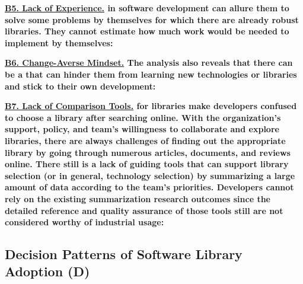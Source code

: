 \nd\bf{\ul{B5. Lack of Experience.}}  in software development can allure them to solve some problems by themselves for which there are already robust libraries. They cannot estimate how much work would be needed to implement by themselves: 


\nd\bf{\ul{B6. Change-Averse Mindset.}} The analysis also reveals that there can be a  that can hinder them from learning new technologies or libraries and stick to their own development: 

\nd\bf{\ul{B7. Lack of Comparison Tools.}}  for libraries make developers confused to choose a library after searching online. With the organization's support, policy, and team's willingness to collaborate and explore libraries, there are always challenges of finding out the appropriate library by going through numerous articles, documents, and reviews online. There still is a lack of guiding tools that can support library selection (or in general, technology selection) by summarizing a large amount of data according to the team's priorities. Developers cannot rely on the existing summarization research outcomes since the detailed reference and quality assurance of those tools still are not considered worthy of industrial usage: 

\subsection{Decision Patterns of Software Library Adoption (D)}
\label{sec:gp}

